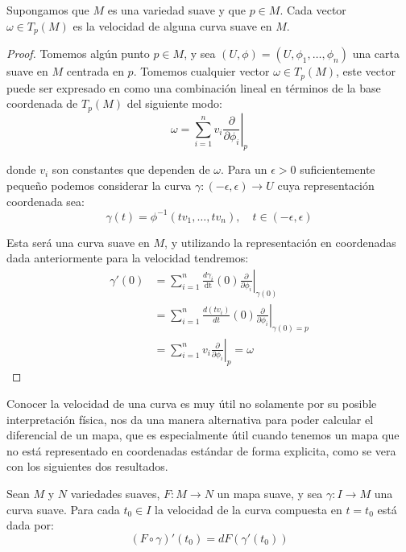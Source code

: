 \begin{theorem}
	Supongamos que $M$ es una variedad suave y que $p \in M$. Cada vector $\omega \in T_p(M)$ es la velocidad de alguna curva suave en $M$.
\end{theorem}

\begin{proof}
	Tomemos algún punto $p \in M$, y sea $(U,\phi) = (U,\phi_1, \dots, \phi_n)$ una carta suave en $M$ centrada en $p$. Tomemos cualquier vector $\omega \in T_p(M)$, este vector puede ser expresado en como una combinación lineal en términos de la base coordenada de $T_p(M)$ del siguiente modo:
	\[
		\omega = \sum_{i=1}^{n} v_i \left.\frac{\partial}{\partial \phi_i}\right|_{p}
	\]

	donde $v_i$ son constantes que dependen de $\omega$. Para un $\epsilon > 0$ suficientemente pequeño podemos considerar la curva $\gamma: (-\epsilon, \epsilon) \to U$ cuya representación coordenada sea:
	\[
		\gamma(t) = \phi^{-1}(tv_1, \dots, tv_n), \quad t \in (-\epsilon,\epsilon)
	\]

	Esta será una curva suave en $M$, y utilizando la representación en coordenadas dada anteriormente para la velocidad tendremos:
	\begin{align*}
		\gamma'(0) & = \sum_{i=1}^{n} \frac{d\gamma_i}{\mathrm{dt}}(0)
		\left.  \frac{\partial}{\partial \phi_i}\right|_{\gamma(0)}                         \\
		           & = \sum_{i=1}^{n} \frac{d (tv_i)}{dt}(0)
		\left. \frac{\partial}{\partial \phi_i} \right|_{\gamma(0)= p}                      \\
		           & = \sum_{i=1}^{n} v_i \left. \frac{\partial}{\partial \phi_i} \right|_p
		= \omega
	\end{align*}
\end{proof}

Conocer la velocidad de una curva es muy útil no solamente por su posible interpretación física, nos da una manera alternativa para poder calcular el diferencial de un mapa, que es especialmente útil cuando tenemos un mapa que no está representado en coordenadas estándar de forma explicita, como se vera con los siguientes dos resultados.

\begin{lemma}
	Sean $M$ y $N$ variedades suaves, $F: M \to N$ un mapa suave, y sea $\gamma: I \to M$ una curva suave. Para cada $t_0 \in I$ la velocidad de la curva compuesta en $t=t_0$ está dada por:
	\[ (F \circ \gamma)'(t_0) = dF(\gamma'(t_0)) \]
\end{lemma}

